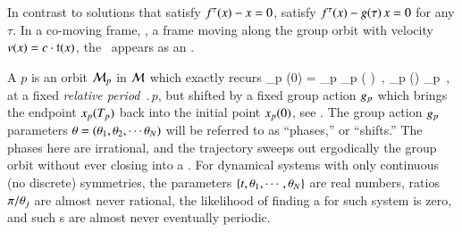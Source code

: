 In contrast to \emph{\eqv} solutions that satisfy
$f^\tau(x) - x = 0$, \emph{\reqva} satisfy $f^\tau(x) -
g( \tau) \, x= 0$ for any $\tau$. In a co-moving frame, \ie, a frame moving
along the group orbit with velocity
$v(x) = c \cdot \mathfrak{t}(x)$,
the \reqv\ appears as an \eqv.

A {\em \rpo} $p$ is an orbit ${\cal M}_p$ in {\statesp} ${\cal M}$
which exactly recurs
\beq
\ssp_p (0) = \LieEl_p \ssp_p ( )
    \,,\qquad
\ssp_p (\tau) \in \pS_p
    \,,
\label{RPOrelper1}
\eeq
at a fixed {\em relative period} $\period{p}$, but
shifted by a fixed group action ${g_p}$
which brings the endpoint $x_p ({T_{p}} ) $
back into the initial point $x_p (0) $, see .
The group action ${g_p}$ parameters
${\bf \theta} = ({\bf \theta}_1,{\bf \theta}_2,\cdots{\bf \theta}_N)$
will be referred to as ``phases,'' or ``shifts.''
The phases here are irrational, and the trajectory sweeps out
ergodically the group orbit without ever closing into a \po.
For dynamical systems with only continuous (no discrete)
symmetries, the parameters $\{t,{\bf \theta}_1,\cdots,{\bf \theta}_N\}$
are real numbers, ratios $\pi/{\bf \theta}_j$ are almost never
rational, the likelihood of finding a {\po} for such system is
{zero}, and such \rpo s are almost never eventually periodic.

